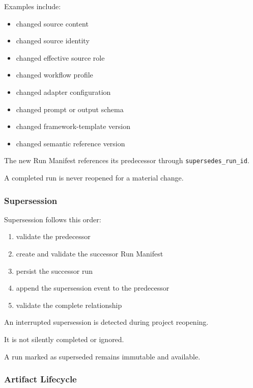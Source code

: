 Examples include:

\begin{itemize}
\tightlist
\item
  changed source content
\item
  changed source identity
\item
  changed effective source role
\item
  changed workflow profile
\item
  changed adapter configuration
\item
  changed prompt or output schema
\item
  changed framework-template version
\item
  changed semantic reference version
\end{itemize}

The new Run Manifest references its predecessor through \texttt{supersedes\_run\_id}.

A completed run is never reopened for a material change.

\hypertarget{supersession}{%
\subsubsection{Supersession}\label{supersession}}

Supersession follows this order:

\begin{enumerate}
\def\labelenumi{\arabic{enumi}.}
\tightlist
\item
  validate the predecessor
\item
  create and validate the successor Run Manifest
\item
  persist the successor run
\item
  append the supersession event to the predecessor
\item
  validate the complete relationship
\end{enumerate}

An interrupted supersession is detected during project reopening.

It is not silently completed or ignored.

A run marked as superseded remains immutable and available.

\hypertarget{artifact-lifecycle}{%
\subsubsection{Artifact Lifecycle}\label{artifact-lifecycle}}

